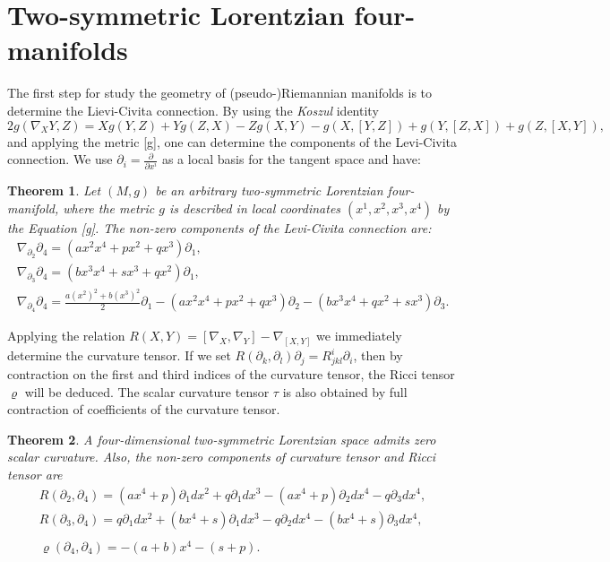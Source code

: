 \documentclass[11pt,oneside,leqno]{amsart}
\theoremstyle{plain}
\newtheorem{theorem}{Theorem}[section]
\begin{document}
\section{Two-symmetric Lorentzian four-manifolds}
The first step for study the geometry of  (pseudo-)Riemannian manifolds is to determine the Lievi-Civita connection. By using the {\em Koszul} identity $2g(\nabla_XY,Z)=Xg(Y,Z)+Yg(Z,X)-Zg(X,Y)-g(X,[Y,Z])+g(Y,[Z,X])+g(Z,[X,Y]),$ and applying the metric \eqref{g}, one can determine the components of the Levi-Civita connection. We use ${\partial}_i=\frac{\partial}{{\partial} x^i}$ as a local basis for the tangent space and have:
\vspace{.3cm}
\begin{theorem}
Let $(M,g)$ be an arbitrary two-symmetric Lorentzian four-manifold, where the metric $g$ is described in local coordinates $(x^1,x^2,x^3,x^4)$ by the Equation \eqref{g}. The non-zero components of the Levi-Civita connection are:
\begin{equation}
\begin{array}{l}
\nabla_{{\partial}_2}{\partial}_4=(ax^2x^4+px^2+qx^3){\partial}_1,\\
\nabla_{{\partial}_3}{\partial}_4=(bx^3x^4+sx^3+qx^2){\partial}_1,\\
\nabla_{{\partial}_4}{\partial}_4=\frac{a(x^2)^2+b(x^3)^2}{2}{\partial}_1-(ax^2x^4+px^2+qx^3){\partial}_2-(bx^3x^4+qx^2+sx^3){\partial}_3.
\end{array}
\end{equation}
\end{theorem}
Applying the relation $R(X,Y)=[\nabla_X,\nabla_Y]-\nabla_{[X,Y]}$ we immediately determine the curvature tensor. If we  set $R({\partial}_k,{\partial}_l){\partial}_j=R^i_{jkl}{\partial}_i$, then by contraction on the first and  third indices of the curvature tensor, the Ricci tensor $\varrho$ will be deduced. The scalar curvature tensor $\tau$ is also obtained by full contraction of coefficients of the curvature tensor.
\vspace{.3cm}
\begin{theorem}
A four-dimensional two-symmetric Lorentzian space admits zero scalar curvature. Also, the non-zero components of curvature tensor and Ricci tensor are
\begin{equation}\label{R}
\begin{array}{l}
R({\partial}_2,{\partial}_4)=(ax^4+p){\partial}_1dx^2+q{\partial}_1dx^3-(ax^4+p){\partial}_2dx^4-q{\partial}_3dx^4,\\
R({\partial}_3,{\partial}_4)=q{\partial}_1dx^2+(bx^4+s){\partial}_1dx^3-q{\partial}_2dx^4-(bx^4+s){\partial}_3dx^4,\\
\\
\varrho({\partial}_4,{\partial}_4)=-(a+b)x^4-(s+p).
\end{array}
\end{equation}
\end{theorem}
\end{document}
